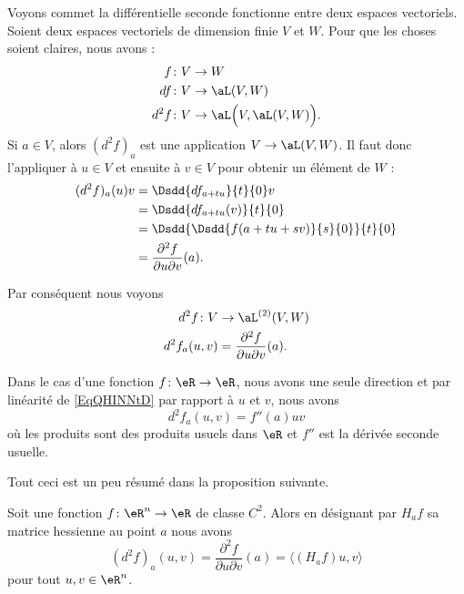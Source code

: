 \begin{example} \label{ExZHZYcNH}
    Voyons commet la différentielle seconde fonctionne entre deux espaces vectoriels. Soient deux espaces vectoriels de dimension finie \( V\) et \( W\). Pour que les choses soient claires, nous avons :
    \begin{subequations}
        \begin{align}
            f&\colon V\to W\\
            df&\colon V\to \aL(V,W)\\
            d^2f&\colon V\to \aL\Big( V,\aL(V,W) \Big).
        \end{align}
    \end{subequations}
    Si \( a\in V\), alors \( (d^2f)_a\) est une application \( V\to \aL(V,W)\). Il faut donc l'appliquer à \( u\in V\) et ensuite à \( v\in V\) pour obtenir un élément de \( W\) :
    \begin{subequations}
        \begin{align}
            (d^2f)_a(u)v&=\Dsdd{ df_{a+tu} }{t}{0}v\\
            &=\Dsdd{ df_{a+tu}(v) }{t}{0}\\
            &=\Dsdd{ \Dsdd{ f(a+tu+sv) }{s}{0} }{t}{0}\\
            &=\frac{ \partial^2f }{ \partial u\partial v }(a).
        \end{align}
    \end{subequations}
    

    Par conséquent nous voyons
    \begin{equation}\label{EqQHINNtD}
        \begin{aligned}
            d^2f\colon V&\to \aL^{(2)}(V,W) \\
            d^2f_a(u,v)&=\frac{ \partial^2f  }{ \partial u\partial v }(a). 
        \end{aligned}
    \end{equation}
    
    Dans le cas d'une fonction \( f\colon \eR\to \eR\), nous avons une seule direction et par linéarité de \eqref{EqQHINNtD} par rapport à \( u\) et \( v\), nous avons
    \begin{equation}        \label{EQooSOCGooIiNGmG}
        d^2f_a(u,v)=f''(a)uv
    \end{equation}
    où les produits sont des produits usuels dans \( \eR\) et \( f''\) est la dérivée seconde usuelle.
\end{example}

Tout ceci est un peu résumé dans la proposition suivante.
\begin{proposition}     \label{PROPooFWZYooUQwzjW}
    Soit une fonction \( f\colon \eR^n\to \eR\) de classe \( C^2\). Alors en désignant par \( H_af\) sa matrice hessienne au point \( a\) nous avons
    \begin{equation}
        (d^2f)_a(u,v)=\frac{ \partial^2f }{ \partial u\partial v }(a)=\langle (H_af)u, v\rangle 
    \end{equation}
    pour tout \( u,v\in \eR^n\).
\end{proposition}


